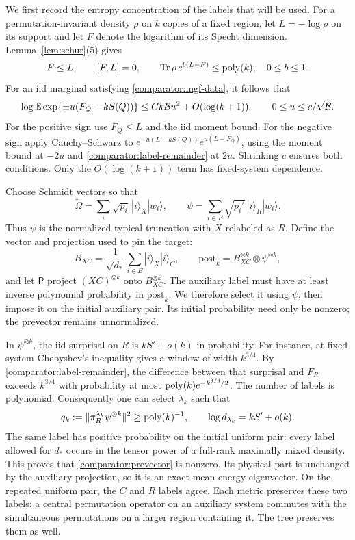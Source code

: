 We first record the entropy concentration of the labels that will be used.
For a permutation-invariant density $\rho$ on $k$ copies of a fixed region,
let $L=-\log\rho$ on its support and let $F$ denote the logarithm of its
Specht dimension. Lemma~\ref{lem:schur}(5) gives
\begin{equation}
 F\le L,\qquad [F,L]=0,\qquad
 \operatorname{Tr}\rho\,e^{b(L-F)}\le\operatorname{poly}(k),\quad 0\le b\le1.
 \label{comparator:label-remainder}
\end{equation}
For an iid marginal satisfying \eqref{comparator:mgf-data}, it follows that
\begin{equation}
 \log\mathbb E\exp\{\pm u(F_Q-kS(Q))\}
       \le Ck\mathcal B u^2+O(\log(k+1)),
 \qquad 0\le u\le c/\sqrt{\mathcal B}.
 \label{comparator:signed-label-moments}
\end{equation}
For the positive sign use $F_Q\le L$ and the iid moment bound.
For the negative sign apply Cauchy--Schwarz to
$e^{-u(L-kS(Q))}e^{u(L-F_Q)}$, using the moment bound at $-2u$ and
\eqref{comparator:label-remainder} at $2u$.  Shrinking $c$ ensures both
conditions.  Only the $O(\log(k+1))$ term has fixed-system dependence.

Choose Schmidt vectors so that
\[
 \widetilde\Omega=\sum_i\sqrt{p_i}\,|i\rangle_X|w_i\rangle,
 \qquad
 \psi=\sum_{i\in E}\sqrt{p_i'}\,|i\rangle_R|w_i\rangle.
\]
Thus $\psi$ is the normalized typical truncation with $X$ relabeled as
$R$.  Define the vector and projection used to pin the target:
\[
 B_{XC}=\frac1{\sqrt{d_*}}\sum_{i\in E}|i\rangle_X|i\rangle_C,
 \qquad
 \mathrm{post}_k=B_{XC}^{\otimes k}\otimes\psi^{\otimes k},
\]
and let $\mathsf P$ project $(XC)^{\otimes k}$ onto
$B_{XC}^{\otimes k}$.
The auxiliary label must have at least inverse polynomial probability in
$\mathrm{post}_k$.  We therefore select it using $\psi$, then impose
it on the initial auxiliary pair.  Its initial probability need only
be nonzero; the prevector remains unnormalized.

In $\psi^{\otimes k}$, the iid surprisal on $R$ is
$kS'+o(k)$ in probability.  For instance, at fixed system Chebyshev's
inequality gives a window of width $k^{3/4}$.  By
\eqref{comparator:label-remainder}, the difference between that surprisal
and $F_R$ exceeds $k^{3/4}$ with probability at most
$\operatorname{poly}(k)e^{-k^{3/4}/2}$.  The number of labels is polynomial.
Consequently one can select $\lambda_k$ such that
\begin{equation}
 q_k:=\|\pi_R^{\lambda_k}\psi^{\otimes k}\|^2
       \ge\operatorname{poly}(k)^{-1},\qquad
 \log d_{\lambda_k}=kS'+o(k).
 \label{comparator:high-label}
\end{equation}
The same label has positive probability on the initial uniform pair:
every label allowed for $d_*$ occurs in the tensor power of a full-rank
maximally mixed density.  This proves that \eqref{comparator:prevector}
is nonzero.  Its physical part is unchanged by the auxiliary projection,
so it is an exact mean-energy eigenvector.  On the repeated uniform pair,
the $C$ and $R$ labels agree.  Each metric preserves these two labels:
a central permutation operator on an auxiliary system commutes with the
simultaneous permutations on a larger region containing it.  The tree
preserves them as well.

